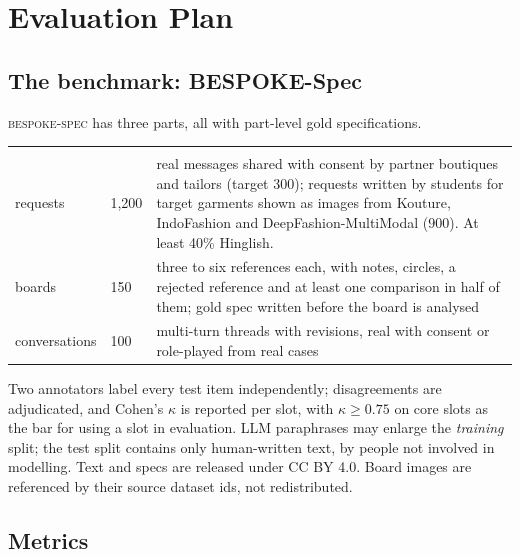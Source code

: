 \chapter{Evaluation Plan}\label{ch:eval}

\section{The benchmark: BESPOKE-Spec}

\textsc{bespoke-spec} has three parts, all with part-level gold specifications.

\begin{table}[h]
\centering\small
\begin{tabularx}{\textwidth}{@{}P{2.6cm}P{2.2cm}L@{}}
 &  & \\
requests & 1,200 & real messages shared with consent by partner boutiques and tailors (target 300); requests written by students for target garments shown as images from Kouture, IndoFashion and DeepFashion-MultiModal (900). At least 40\% Hinglish.\\
boards & 150 & three to six references each, with notes, circles, a rejected reference and at least one comparison in half of them; gold spec written before the board is analysed\\
conversations & 100 & multi-turn threads with revisions, real with consent or role-played from real cases\\
\end{tabularx}
\end{table}

Two annotators label every test item independently; disagreements are adjudicated, and Cohen's $\kappa$ is reported per slot, with $\kappa \ge 0.75$ on core slots as the bar for using a slot in evaluation. LLM paraphrases may enlarge the \emph{training} split; the test split contains only human-written text, by people not involved in modelling. Text and specs are released under CC BY 4.0. Board images are referenced by their source dataset ids, not redistributed.

\section{Metrics}

